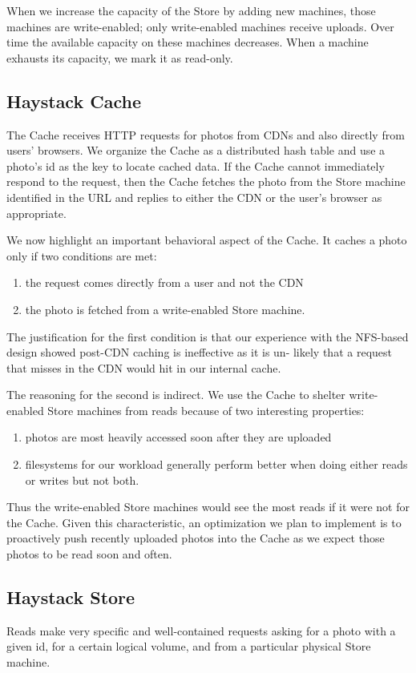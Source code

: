 \documentclass[11pt]{article}
\begin{document}
When we increase the capacity of the Store by adding new machines, those machines are write-enabled;
only write-enabled machines receive uploads. Over time the available capacity on these machines
decreases. When a machine exhausts its capacity, we mark it as read-only.
\subsection{Haystack Cache}
\label{sec:orgcc7baa5}
The Cache receives HTTP requests for photos from CDNs and also directly from users’ browsers. We
organize the Cache as a distributed hash table and use a photo’s id as the key to locate cached data.
If the Cache cannot immediately respond to the request, then the Cache fetches the photo from the
Store machine identified in the URL and replies to either the CDN or the user’s browser as
appropriate.

We now highlight an important behavioral aspect of the Cache. It caches a photo only if two conditions
are met:
\begin{enumerate}
\item the request comes directly from a user and not the CDN
\item the photo is fetched from a write-enabled Store machine.
\end{enumerate}

The justification for the first condition is that our experience with the NFS-based design showed
post-CDN caching is ineffective as it is un- likely that a request that misses in the CDN would hit in
our internal cache.

The reasoning for the second is indirect. We use the Cache to shelter write-enabled Store machines
from reads because of two interesting properties:
\begin{enumerate}
\item photos are most heavily accessed soon after they are uploaded
\item filesystems for our workload generally perform better when doing either reads or writes but not
both.
\end{enumerate}

Thus the write-enabled Store machines would see the most reads if it were not for the Cache. Given
this characteristic, an optimization we plan to implement is to proactively push recently uploaded
photos into the Cache as we expect those photos to be read soon and often.
\subsection{Haystack Store}
\label{sec:org36a396b}
Reads make very specific and well-contained requests asking for a photo with a given id, for a certain
logical volume, and from a particular physical Store machine.
\end{document}
